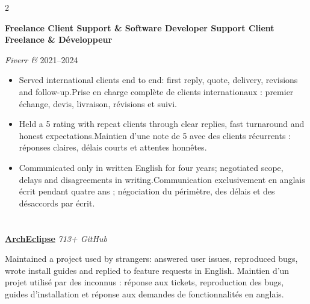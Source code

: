 \documentclass[10pt,a4paper]{article}
\newcommand{\ghstar}{\textcolor{accent!65}{\faStar}}
\providecommand{\archEclipseStars}{713}
\begin{document}
\begin{paracol}{2}
\vspace{0.7em}


\textbf{
{Freelance Client Support \& Software Developer}
{Support Client Freelance \& Développeur}
}

\textit{Fiverr \& }
\hfill
2021--2024

\begin{itemize}
\item {}
{Served international clients end to end: first reply, quote, delivery, revisions and follow-up.}{Prise en charge complète de clients internationaux : premier échange, devis, livraison, révisions et suivi.}
\item {}
{Held a 5\ghstar{} rating with repeat clients through clear replies, fast turnaround and honest expectations.}{Maintien d'une note de 5\ghstar{} avec des clients récurrents : réponses claires, délais courts et attentes honnêtes.}
\item {}
{Communicated only in written English for four years; negotiated scope, delays and disagreements in writing.}{Communication exclusivement en anglais écrit pendant quatre ans ; négociation du périmètre, des délais et des désaccords par écrit.}
\end{itemize}


\section*{}

\textbf{\href{https://github.com/AymanLyesri/ArchEclipse}{ArchEclipse}}
\hfill
\textit{\archEclipseStars+\ghstar{} GitHub}

\smallskip

{
Maintained a project used by strangers: answered user issues, reproduced bugs, wrote install guides and replied to feature requests in English.
}
{
Maintien d'un projet utilisé par des inconnus : réponse aux tickets, reproduction des bugs, guides d'installation et réponse aux demandes de fonctionnalités en anglais.
}

\vspace{0.9em}


\end{paracol}
\end{document}
